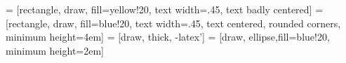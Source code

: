 \documentclass{bmcart}
\begin{document}
 = [rectangle, draw, fill=yellow!20, text width=.45\textwidth, text badly centered]
 = [rectangle, draw, fill=blue!20,
    text width=.45\textwidth, text centered, rounded corners, minimum height=4em]
 = [draw, thick, -latex']
 = [draw, ellipse,fill=blue!20, minimum height=2em]
\def\svgwidth{.8\textwidth}
\newsavebox{\mysquareLow}
\savebox{\mysquareLow}{%
  \raisebox{-0.08em}{%
    \textcolor{black}{%
      \rule{.7em}{.7em}%
    }%
    \hspace{-.65em}%
    \raisebox{.05em}{%
      \textcolor{lowActivity}{%
	\rule{.6em}{.6em}%
      }%
    }%
  }%
}
\newsavebox{\mysquareHigh}
\savebox{\mysquareHigh}{%
  \raisebox{-0.08em}{%
    \textcolor{black}{%
      \rule{.7em}{.7em}%
    }%
    \hspace{-.65em}%
    \raisebox{.05em}{%
      \textcolor{highActivity}{%
	\rule{.6em}{.6em}%
      }%
    }%
  }%
}
\end{document}
